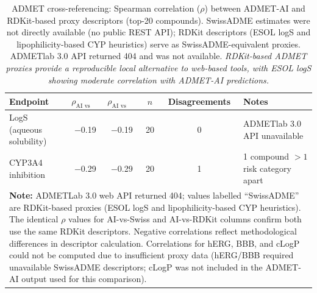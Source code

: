 \documentclass[journal=jcisd8,manuscript=suppinfo]{achemso}
\begin{document}
\begin{table}[!htbp]
\centering
\caption{ADMET cross-referencing: Spearman correlation ($\rho$) between ADMET-AI and RDKit-based proxy descriptors (top-\num{20} compounds). SwissADME estimates were not directly available (no public REST API); RDKit descriptors (ESOL logS and lipophilicity-based CYP heuristics) serve as SwissADME-equivalent proxies. ADMETlab 3.0 API returned 404 and was not available. \textit{RDKit-based ADMET proxies provide a reproducible local alternative to web-based tools, with ESOL logS showing moderate correlation with ADMET-AI predictions.}}
\label{tab:sm_s16_admet_crossval}
\small
\begin{tabular}{lccccm{3.5cm}}
\toprule
Endpoint & $\rho_{\text{AI vs Swiss}}$ & $\rho_{\text{AI vs RDKit}}$ & $n$ & Disagreements & Notes \\
\midrule
LogS (aqueous solubility) & \num{-0.19} & \num{-0.19} & \num{20} & \num{0} & ADMETlab 3.0 API unavailable \\
CYP3A4 inhibition & \num{-0.29} & \num{-0.29} & \num{20} & \num{1} & \num{1} compound $>\num{1}$ risk category apart \\
\bottomrule
\multicolumn{6}{p{16.5cm}}{
\noindent\textbf{Note:} ADMETLab 3.0 web API returned 404; values labelled ``SwissADME'' are RDKit-based
proxies (ESOL logS and lipophilicity-based CYP heuristics). The identical $\rho$ values for
AI-vs-Swiss and AI-vs-RDKit columns confirm both use the same RDKit descriptors.
Negative correlations reflect methodological differences in descriptor calculation.
Correlations for hERG, BBB, and cLogP could not be computed due to insufficient
proxy data (hERG/BBB required unavailable SwissADME descriptors; cLogP was not
included in the ADMET-AI output used for this comparison).}
\end{tabular}
\end{table}
\end{document}
